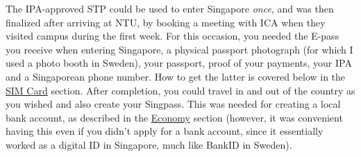 The IPA-approved STP could be used to enter Singapore \textit{once}, and was then finalized after arriving at NTU, by booking a meeting with ICA when they visited campus during the first week. For this occasion, you needed the E-pass you receive when entering Singapore, a physical passport photograph (for which I used a photo booth in Sweden), your passport, proof of your payments, your IPA and a Singaporean phone number. How to get the latter is covered below in the \hyperref[sims]{SIM Card} section. After completion, you could travel in and out of the country as you wished and also create your Singpass. This was needed for creating a local bank account, as described in the \hyperref[eco]{Economy} section (however, it was convenient having this even if you didn't apply for a bank account, since it essentially worked as a digital ID in Singapore, much like BankID in Sweden).

